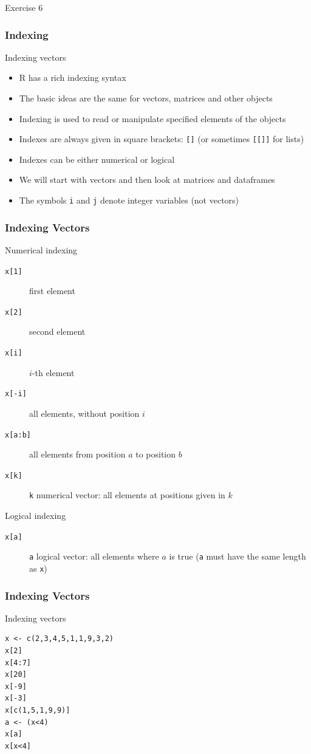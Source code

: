 \documentclass[xcolor={svgnames},10pt,
handout
]{beamer}
\begin{document}
\begin{frame}[standout]
Exercise 6
\end{frame}

\begin{frame}
\frametitle{Indexing}
Indexing vectors
\begin{itemize}
	\item R has a rich indexing syntax
	\item The basic ideas are the same for vectors, matrices and other objects
	\item Indexing is used to read or manipulate specified elements of the
	objects
	\item Indexes are always given in square brackets: \texttt{[]} \newline
	(or sometimes \texttt{[[]]} for lists)
	\item Indexes can be either numerical or logical
	\item We will start with vectors and then look at matrices and dataframes
	\item The symbols \texttt{i} and \texttt{j} denote integer variables (not
	vectors)
\end{itemize}
\end{frame}


\begin{frame}
\frametitle{Indexing Vectors}
Numerical indexing
\begin{description}
\item[{\texttt{x[1]}}] first element
\item[{\texttt{x[2]}}] second element
\item[{\texttt{x[i]}}] $i$-th element
\item[{\texttt{x[-i]}}] all elements, without position $i$
\item[{\texttt{x[a:b]}}] all elements from position $a$ to position $b$
\item[{\texttt{x[k]}}] \texttt{k} numerical vector: all elements at positions
given in $k$
\end{description}

Logical indexing
\begin{description}
\item[{\texttt{x[a]}}] \texttt{a} logical vector: all elements where $a$ is
true \newline
(\texttt{a} must have the same length as \texttt{x})
\end{description}
\end{frame}


\begin{frame}[fragile]
\frametitle{Indexing Vectors}
Indexing vectors
\begin{lstlisting}
x <- c(2,3,4,5,1,1,9,3,2)
x[2]
x[4:7]
x[20]
x[-9]
x[-3]
x[c(1,5,1,9,9)]
a <- (x<4)
x[a]
x[x<4]
\end{lstlisting}
\end{frame}
\end{document}

